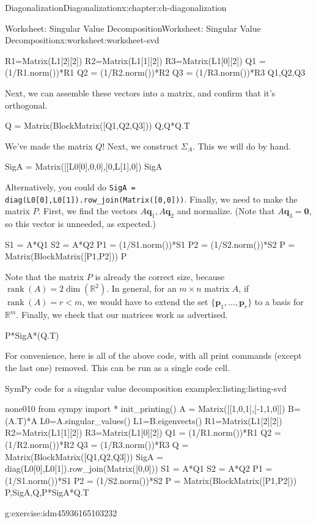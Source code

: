 \documentclass[oneside,10pt,]{book}
\newcommand{\mono}[1]{\texttt{#1}}
\numberwithin{equation}{section}
\newcommand{\R}{\mathbb{R}}
\newcommand{\rank}{\operatorname{rank}}
\newcommand{\zer}{\mathbf{0}}
\newcommand{\vecq}{\mathbf{q}}
\newcommand{\vecp}{\mathbf{p}}
\newcommand{\lt}{<}
\begin{document}
\begin{chapterptx}{Diagonalization}{}{Diagonalization}{}{}{x:chapter:ch-diagonalization}
\begin{worksheet-section}{Worksheet: Singular Value Decomposition}{}{Worksheet: Singular Value Decomposition}{}{}{x:worksheet:worksheet-svd}
\begin{sageinput}
R1=Matrix(L1[2][2])
R2=Matrix(L1[1][2])
R3=Matrix(L1[0][2])
Q1 = (1/R1.norm())*R1
Q2 = (1/R2.norm())*R2
Q3 = (1/R3.norm())*R3
Q1,Q2,Q3
\end{sageinput}
Next, we can assemble these vectors into a matrix, and confirm that it's orthogonal.%
\begin{sageinput}
Q = Matrix(BlockMatrix([Q1,Q2,Q3]))
Q,Q*Q.T
\end{sageinput}
We've made the matrix \(Q\)! Next, we construct \(\Sigma_A\). This we will do by hand.%
\begin{sageinput}
SigA = Matrix([[L0[0],0,0],[0,L[1],0])
SigA
\end{sageinput}
Alternatively, you could do \mono{SigA = diag(L0[0],L0[1]).row\_join(Matrix([0,0]))}. Finally, we need to make the matrix \(P\). First, we find the vectors \(A\vecq_1, A\vecq_2\) and normalize. (Note that \(A\vecq_3=\zer\), so this vector is unneeded, as expected.)%
\begin{sageinput}
S1 = A*Q1
S2 = A*Q2
P1 = (1/S1.norm())*S1
P2 = (1/S2.norm())*S2
P = Matrix(BlockMatrix([P1,P2]))
P
\end{sageinput}
Note that the matrix \(P\) is already the correct size, because \(\rank(A)=2\dim(\R^2)\). In general, for an \(m\times n\) matrix \(A\), if \(\rank(A)=r\lt m\), we would have to extend the set \(\{\vecp_1,\ldots, \vecp_r\}\) to a basis for \(\R^m\). Finally, we check that our matrices work as advertised.%
\begin{sageinput}
P*SigA*(Q.T)
\end{sageinput}
For convenience, here is all of the above code, with all print commands (except the last one) removed. This can be run as a single code cell.%
\begin{listingptx}{SymPy code for a singular value decomposition example}{x:listing:listing-svd}{}%
\begin{program}{none}{0}{1}{0}
from sympy import *
init_printing()
A = Matrix([[1,0,1],[-1,1,0]])
B=(A.T)*A
L0=A.singular_values()
L1=B.eigenvects()
R1=Matrix(L1[2][2])
R2=Matrix(L1[1][2])
R3=Matrix(L1[0][2])
Q1 = (1/R1.norm())*R1
Q2 = (1/R2.norm())*R2
Q3 = (1/R3.norm())*R3
Q = Matrix(BlockMatrix([Q1,Q2,Q3]))
SigA = diag(L0[0],L0[1]).row_join(Matrix([0,0]))
S1 = A*Q1
S2 = A*Q2
P1 = (1/S1.norm())*S1
P2 = (1/S2.norm())*S2
P = Matrix(BlockMatrix([P1,P2]))
P,SigA,Q,P*SigA*Q.T
\end{program}
\tcblower
\end{listingptx}%
\begin{divisionexercise}{1}{}{}{g:exercise:idm45936165103232}%

\end{divisionexercise}
\end{worksheet-section}
\end{chapterptx}
\end{document}
